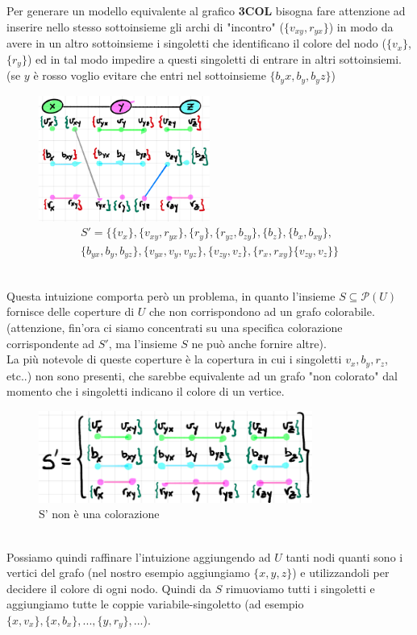 \documentclass[a4paper]{article}
\begin{document}
Per generare un modello equivalente al grafico \textbf{3COL} bisogna fare attenzione ad inserire nello stesso sottoinsieme gli archi di "incontro" ($\{v_{xy},r_{yx}\}$) in modo da avere in un altro sottoinsieme i singoletti che identificano il colore del nodo ($\{v_x\}$,$\{r_y\}$) ed in tal modo impedire a questi singoletti di entrare in altri sottoinsiemi. (se $y$ è rosso voglio evitare che entri nel sottoinsieme $\{b_yx,b_y,b_yz\}$)
\begin{figure}[!ht]
                \centering
                \includegraphics[width = 0.5\textwidth]{./img/E11_colorazione.png}
		\begin{align*} 
			S'=\{\{v_x\},\{v_{xy}, r_{yx}\},\{r_y\}, \{ r_{yz}, b_{zy} \}, \{b_z\}, \{b_x, b_{xy} \}, \\
			\{b_{yx}, b_y, b_{yz} \}, \{v_{yx}, v_y, v_{yz} \}, \{v_{zy},v_z \},\{r_x, r_{xy} \}  \{v_{zy},v_z \}\}
		\end{align*}
\end{figure}\\
Questa intuizione comporta però un problema, in quanto l'insieme $S \subseteq \mathcal{P}(U)$ fornisce delle coperture di $U$ che non corrispondono ad un grafo colorabile.
(attenzione, fin'ora ci siamo concentrati su una specifica colorazione corrispondente ad $S'$, ma l'insieme $S$ ne può anche fornire altre).\\
La più notevole di queste coperture è la copertura in cui i singoletti $v_x,b_y,r_z$, etc..) non sono presenti, che sarebbe equivalente ad un grafo "non colorato" dal momento che i singoletti indicano il colore di un vertice.\\
\begin{figure}[!ht]
                \centering
                \includegraphics[width = 0.8\textwidth]{./img/E11_degenere.png}
                \caption{S' non è una colorazione} \label{FIG:E11_degenere}
\end{figure}\\
Possiamo quindi raffinare l'intuizione aggiungendo ad $U$ tanti nodi quanti sono i vertici del grafo (nel nostro esempio aggiungiamo $\{x,y,z\}$) e utilizzandoli per decidere il colore di ogni nodo.
Quindi da $S$ rimuoviamo tutti i singoletti e aggiungiamo tutte le coppie variabile-singoletto (ad esempio $\{x,v_x\},\{x, b_x\},...,\{y,r_y\},...$).
\end{document}
